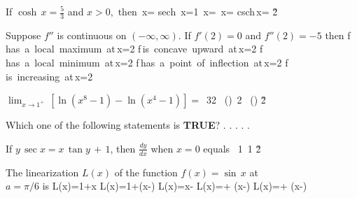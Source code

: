\documentclass[amsfonts,bezier,leqno,fleqn,12pt,a4paper]{article}
\begin{document}
{{{{\begin{large}
\newpage



\item %
If $\displaystyle \cosh\,x=\frac{5}{3}$ and $x>0,$ then
\sc
\be
\displaystyle \sinh\,x=
\ee
\be
\displaystyle \mbox{sech}\, x=1
\ee
\be
\displaystyle \coth\,x=
\ee
\be
\displaystyle \tanh\,x=
\ee
\be
\displaystyle \mbox{csch}\,x=
\ee
\v2



\item %
Suppose $f''$ is continuous on $(-\infty,\infty).$ If $f'(2)=0$ and $f''(2)=-5$ then
\sc
\be
f\,\mbox{has a local maximum at}\,x=2
\ee
\be
f\,\mbox{is concave upward at}\,x=2
\ee
\be
f\,\mbox{has a local minimum at}\,x=2
\ee
\be
f\,\mbox{has a point of inflection at}\,x=2
\ee
\be
f\,\mbox{is increasing at}\,x=2
\ee

\newpage



\item %
$\displaystyle \lim_{x\rightarrow 1^+}\, \left[ \ln(x^8-1)-\ln(x^4-1)\right]=$
\sc
\be
\ln\,32
\ee
\be
\displaystyle \ln\, \left(\displaystyle{}\right)
\ee
{}
\ee
\be
\ln\,2
\ee
\be
\displaystyle \ln\, \left(\displaystyle{}\right)
\ee
\v2



\item %
Which one of the following statements is \textbf{TRUE}?
\sc
\be
.
\ee
\be
.
\ee
\be
.
\ee
\be
.
\ee
\be
.
\ee

\newpage



\item %
If $y\,\sec x=x\, \tan y \,+\, 1$, then $\displaystyle {\frac{dy}{dx}}$ when $x=0$ equals
\sc
\be
\displaystyle {}
\ee
\be
\displaystyle \sec\, 1
\ee
\be
\displaystyle {}
\ee
{}
\ee
\be
\displaystyle \tan\,1
\ee
\v2



\item %
The linearization  $L(x)$ of the function $f(x)=\sin\,x$ at \\$a=\pi/6$ is
\sc
\be
\displaystyle L(x)=1+x
\ee
\be
\displaystyle L(x)=1+\left(x-\right)
\ee
\be
\displaystyle L(x)=x-
\ee
\be
\displaystyle L(x)=+ \left(x-\right)
\ee
\be
\displaystyle L(x)=+ \left(x-\right)
\ee


\end{large}}}}}
\end{document}
